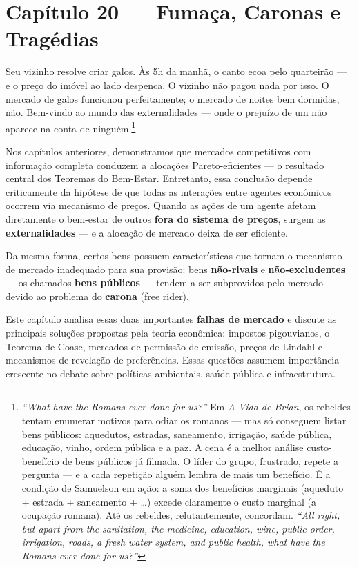 \documentclass[11pt,twoside,openright]{book}
\begin{document}
\chapter{Capítulo 20 --- Fumaça, Caronas e
Tragédias}\label{capuxedtulo-20-fumauxe7a-caronas-e-traguxe9dias}

Seu vizinho resolve criar galos. Às 5h da manhã, o canto ecoa pelo
quarteirão --- e o preço do imóvel ao lado despenca. O vizinho não pagou
nada por isso. O mercado de galos funcionou perfeitamente; o mercado de
noites bem dormidas, não. Bem-vindo ao mundo das externalidades --- onde
o prejuízo de um não aparece na conta de ninguém.\footnote{\emph{``What
  have the Romans ever done for us?''} Em \emph{A Vida de Brian}, os
  rebeldes tentam enumerar motivos para odiar os romanos --- mas só
  conseguem listar bens públicos: aquedutos, estradas, saneamento,
  irrigação, saúde pública, educação, vinho, ordem pública e a paz. A
  cena é a melhor análise custo-benefício de bens públicos já filmada. O
  líder do grupo, frustrado, repete a pergunta --- e a cada repetição
  alguém lembra de mais um benefício. É a condição de Samuelson em ação:
  a soma dos benefícios marginais (aqueduto + estrada + saneamento +
  \ldots) excede claramente o custo marginal (a ocupação romana). Até os
  rebeldes, relutantemente, concordam. \emph{``All right, but apart from
  the sanitation, the medicine, education, wine, public order,
  irrigation, roads, a fresh water system, and public health, what have
  the Romans ever done for us?''}}

Nos capítulos anteriores, demonstramos que mercados competitivos com
informação completa conduzem a alocações Pareto-eficientes --- o
resultado central dos Teoremas do Bem-Estar. Entretanto, essa conclusão
depende criticamente da hipótese de que todas as interações entre
agentes econômicos ocorrem via mecanismo de preços. Quando as ações de
um agente afetam diretamente o bem-estar de outros \textbf{fora do
sistema de preços}, surgem as \textbf{externalidades} --- e a alocação
de mercado deixa de ser eficiente.

Da mesma forma, certos bens possuem características que tornam o
mecanismo de mercado inadequado para sua provisão: bens
\textbf{não-rivais} e \textbf{não-excludentes} --- os chamados
\textbf{bens públicos} --- tendem a ser subprovidos pelo mercado devido
ao problema do \textbf{carona} (free rider).

Este capítulo analisa essas duas importantes \textbf{falhas de mercado}
e discute as principais soluções propostas pela teoria econômica:
impostos pigouvianos, o Teorema de Coase, mercados de permissão de
emissão, preços de Lindahl e mecanismos de revelação de preferências.
Essas questões assumem importância crescente no debate sobre políticas
ambientais, saúde pública e infraestrutura.
\end{document}
